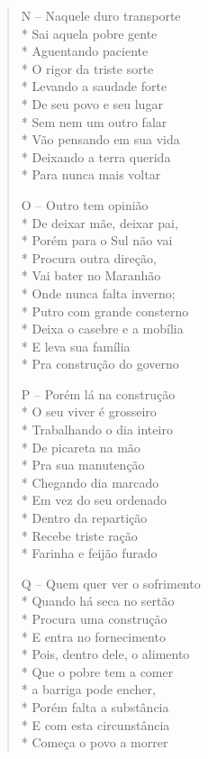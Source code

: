 \begin{verse}
N -- Naquele duro transporte\\*
Sai aquela pobre gente\\*
Aguentando paciente\\*
O rigor da triste sorte\\*
Levando a saudade forte\\*
De seu povo e seu lugar\\*
Sem nem um outro falar\\*
Vão pensando em sua vida\\*
Deixando a terra querida\\*
Para nunca mais voltar

O -- Outro tem opinião\\*
De deixar mãe, deixar pai,\\*
Porém para o Sul não vai\\*
Procura outra direção,\\*
Vai bater no Maranhão\\*
Onde nunca falta inverno;\\*
Putro com grande consterno\\*
Deixa o casebre e a mobília\\*
E leva sua família\\*
Pra construção do governo

P -- Porém lá na construção\\*
O seu viver é grosseiro\\*
Trabalhando o dia inteiro\\*
De picareta na mão\\*
Pra sua manutenção\\*
Chegando dia marcado\\*
Em vez do seu ordenado\\*
Dentro da repartição\\*
Recebe triste ração\\*
Farinha e feijão furado

Q -- Quem quer ver o sofrimento\\*
Quando há seca no sertão\\*
Procura uma construção\\*
E entra no fornecimento\\*
Pois, dentro dele, o alimento\\*
Que o pobre tem a comer\\*
a barriga pode encher,\\*
Porém falta a substância\\*
E com esta circunstância\\*
Começa o povo a morrer


\end{verse}
